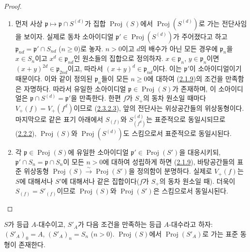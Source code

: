 \begin{proof}
\begin{enumerate}
  \item[\rm(i)] 먼저 사상
    $\mathfrak{p}\mapsto\mathfrak{p}\cap S^{(d)}$가 집합
    $\operatorname{Proj}(S)$에서
    $\operatorname{Proj}(S^{(d)})$로 가는 전단사임을 보이자. 실제로 동차
    소아이디얼 $\mathfrak{p}'\in\operatorname{Proj}(S^{(d)})$가 주어졌다고
    하고 $\mathfrak{p}_{nd}=\mathfrak{p}'\cap S_{nd}$ ($n\geq0$)로 놓자.
    $n>0$이고 $d$의 배수가 아닌 모든 경우에 $\mathfrak{p}_n$을
    $x\in S_n$이고 $x^d\in\mathfrak{p}_{nd}$인 원소들의 집합으로 정의하자.
    $x\in\mathfrak{p}_n$, $y\in\mathfrak{p}_n$이면
    $(x+y)^{2d}\in\mathfrak{p}_{2nd}$이고, 따라서
    $(x+y)^d\in\mathfrak{p}_{nd}$이다. 이는 $\mathfrak{p}'$이
    소아이디얼이기 때문이다. 이와 같이 정의된 $\mathfrak{p}_n$들이 모든
    $n\geq0$에 대하여
    (\hyperref[II.2.1.9-ko]{2.1.9})의 조건을 만족함은 자명하다. 따라서
    유일한 소아이디얼 $\mathfrak{p}\in\operatorname{Proj}(S)$가 존재하며,
    이 소아이디얼은 $\mathfrak{p}\cap S^{(d)}=\mathfrak{p}'$을 만족한다. 한편 $f$가
    $S_+$의 동차 원소일 때마다
    $V_+(f)=V_+(f^d)$이므로
    (\hyperref[II.2.3.2.3-ko]{2.3.2.3}), 앞의 전단사는 위상공간들의
    위상동형이다. 마지막으로 같은 표기 아래에서 $S_{(f)}$와
    $S^{(d)}_{(f^d)}$는 표준적으로 동일시되므로
    (\hyperref[II.2.2.2-ko]{2.2.2}), $\operatorname{Proj}(S)$와
    $\operatorname{Proj}(S^{(d)})$도 스킴으로서 표준적으로 동일시된다.
  \item[\rm(ii)] 각 $\mathfrak{p}\in\operatorname{Proj}(S)$에 유일한
    소아이디얼 $\mathfrak{p}'\in\operatorname{Proj}(S')$을 대응시키되,
    $\mathfrak{p}'\cap S_n=\mathfrak{p}\cap S_n$이 모든 $n>0$에 대하여
    성립하게 하면
    (\hyperref[II.2.1.9-ko]{2.1.9}), 바탕공간들의 표준 위상동형
    $\operatorname{Proj}(S)\xrightarrow{\sim}\operatorname{Proj}(S')$을
    정의함이 분명하다. 실제로 $V_+(f)$는 $S$에 대해서나 $S'$에 대해서나
    같은 집합이다($f$가 $S_+$의 동차 원소일 때). 더욱이
    $S_{(f)}=S'_{(f)}$이므로 $\operatorname{Proj}(S)$와
    $\operatorname{Proj}(S')$은 스킴으로서 동일시된다.
\end{enumerate}
\end{proof}

\begin{corollary}[2.4.8]
\label{II.2.4.8-ko}
$S$가 등급 $A$-대수이고, $S'_A$가 다음 조건을 만족하는 등급
$A$-대수라고 하자: $(S'_A)_0=A$, $(S'_A)_n=S_n$ ($n>0$).
$\operatorname{Proj}(S)$에서 $\operatorname{Proj}(S'_A)$로 가는 표준
동형이 존재한다.
\end{corollary}

